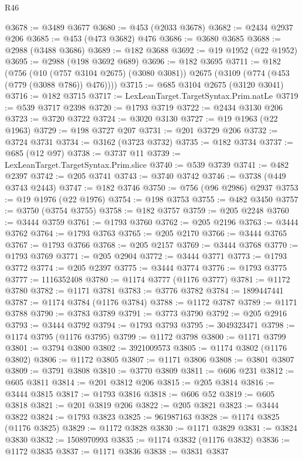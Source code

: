\begin{lexlean}{R46}
\begin{coremodule}
@3678 := @3489 @3677
@3680 := @453 (@2033 @3678)
@3682 := @2434 @2937 @206
@3685 := @453 (@473 @3682) @476
@3686 := @3680 @3685
@3688 := @2988 (@3488 @3686)
@3689 := @182 @3688
@3692 := @19 @1952 (@22 @1952)
@3695 := @2988 (@198 @3692 @689)
@3696 := @182 @3695
@3711 := @182
    (@756
      (@10 (@757 @3104 @2675) (@3080 @3081))
      @2675
      (@3109 (@774 (@453 (@779 (@3088 @786)) @476))))
@3715 := @685 @3104 @2675 (@3120 @3041)
@3716 := @182 @3715
@3717 := LexLeanTarget.TargetSyntax.Prim.natLe
@3719 := @539 @3717 @2398
@3720 := @1793 @3719
@3722 := @2434 @3130 @206
@3723 := @3720 @3722
@3724 := @3020 @3130
@3727 := @19 @1963 (@22 @1963)
@3729 := @198 @3727 @207
@3731 := @201 @3729 @206
@3732 := @3724 @3731
@3734 := @3162 (@3723 @3732)
@3735 := @182 @3734
@3737 := @685 (@12 @97)
@3738 := @3737 @11
@3739 := LexLeanTarget.TargetSyntax.Prim.slice
@3740 := @539 @3739
@3741 := @482 @2397
@3742 := @205 @3741
@3743 := @3740 @3742
@3746 := @3738 (@449 @3743 @2443)
@3747 := @182 @3746
@3750 := @756 (@96 @2986) @2937
@3753 := @19 @1976 (@22 @1976)
@3754 := @198 @3753
@3755 := @482 @3450
@3757 := @3750 (@3754 @3755)
@3758 := @182 @3757
@3759 := @205 @2248
@3760 := @3444 @3759
@3761 := @1793 @3760
@3762 := @205 @2196
@3763 := @3444 @3762
@3764 := @1793 @3763
@3765 := @205 @2170
@3766 := @3444 @3765
@3767 := @1793 @3766
@3768 := @205 @2157
@3769 := @3444 @3768
@3770 := @1793 @3769
@3771 := @205 @2904
@3772 := @3444 @3771
@3773 := @1793 @3772
@3774 := @205 @2397
@3775 := @3444 @3774
@3776 := @1793 @3775
@3777 := 1116352408
@3780 := @1174 @3777 (@1176 @3777)
@3781 := @1172 @3780
@3782 := @1171 @3781
@3783 := @3776 @3782
@3784 := 1899447441
@3787 := @1174 @3784 (@1176 @3784)
@3788 := @1172 @3787
@3789 := @1171 @3788
@3790 := @3783 @3789
@3791 := @3773 @3790
@3792 := @205 @2916
@3793 := @3444 @3792
@3794 := @1793 @3793
@3795 := 3049323471
@3798 := @1174 @3795 (@1176 @3795)
@3799 := @1172 @3798
@3800 := @1171 @3799
@3801 := @3794 @3800
@3802 := 3921009573
@3805 := @1174 @3802 (@1176 @3802)
@3806 := @1172 @3805
@3807 := @1171 @3806
@3808 := @3801 @3807
@3809 := @3791 @3808
@3810 := @3770 @3809
@3811 := @606 @231
@3812 := @605 @3811
@3814 := @201 @3812 @206
@3815 := @205 @3814
@3816 := @3444 @3815
@3817 := @1793 @3816
@3818 := @606 @52
@3819 := @605 @3818
@3821 := @201 @3819 @206
@3822 := @205 @3821
@3823 := @3444 @3822
@3824 := @1793 @3823
@3825 := 961987163
@3828 := @1174 @3825 (@1176 @3825)
@3829 := @1172 @3828
@3830 := @1171 @3829
@3831 := @3824 @3830
@3832 := 1508970993
@3835 := @1174 @3832 (@1176 @3832)
@3836 := @1172 @3835
@3837 := @1171 @3836
@3838 := @3831 @3837

\end{coremodule}
\end{lexlean}
